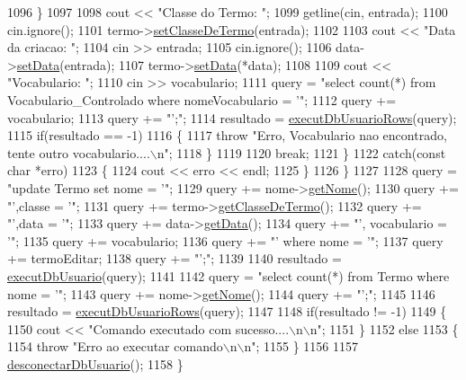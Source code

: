 \begin{DoxyCode}
1096       \}
1097 
1098       cout << \textcolor{stringliteral}{"Classe do Termo: "};
1099       getline(cin, entrada);
1100       cin.ignore();
1101       termo->\mbox{\hyperlink{class_termo_a8c32e501b39e008ea369650e3eb196b1}{setClasseDeTermo}}(entrada);
1102 
1103       cout << \textcolor{stringliteral}{"Data da criacao: "};
1104       cin >> entrada;
1105       cin.ignore();
1106       data->\mbox{\hyperlink{class_data_a5245638838a033c98a8b760836dddb7d}{setData}}(entrada);
1107       termo->\mbox{\hyperlink{class_termo_abf829a90ed067a580bb9d4c90db0f160}{setData}}(*data);
1108 
1109       cout << \textcolor{stringliteral}{"Vocabulario: "};
1110       cin >> vocabulario;
1111       query = \textcolor{stringliteral}{"select count(*) from Vocabulario\_Controlado where nomeVocabulario = '"};
1112       query += vocabulario;
1113       query += \textcolor{stringliteral}{"';"};
1114       resultado = \mbox{\hyperlink{comando_sql_8cpp_af54952694f2fa7d76f969fb74b853cb9}{executDbUsuarioRows}}(query);
1115       \textcolor{keywordflow}{if}(resultado == -1)
1116       \{
1117         \textcolor{keywordflow}{throw} \textcolor{stringliteral}{"Erro, Vocabulario nao encontrado, tente outro vocabulario....\(\backslash\)n"};
1118       \}
1119 
1120       \textcolor{keywordflow}{break};
1121     \}
1122     \textcolor{keywordflow}{catch}(\textcolor{keyword}{const} \textcolor{keywordtype}{char} *erro)
1123     \{
1124       cout << erro << endl;
1125     \}
1126   \}
1127 
1128     query = \textcolor{stringliteral}{"update Termo set nome = '"};
1129     query += nome->\mbox{\hyperlink{class_nome_aad41176173eec20cbbae1576447a3697}{getNome}}();
1130     query += \textcolor{stringliteral}{"',classe = '"};
1131     query += termo->\mbox{\hyperlink{class_termo_ae7e8fb47c8e03506b98a952fa25aa97b}{getClasseDeTermo}}();
1132     query += \textcolor{stringliteral}{"',data = '"};
1133     query += data->\mbox{\hyperlink{class_data_afc7b15a5e81334858e48709b2f45cdc3}{getData}}();
1134     query += \textcolor{stringliteral}{"', vocabulario = '"};
1135     query += vocabulario;
1136     query += \textcolor{stringliteral}{"' where nome = '"};
1137     query += termoEditar;
1138     query += \textcolor{stringliteral}{"';"};
1139 
1140     resultado = \mbox{\hyperlink{comando_sql_8cpp_a748197580e7f9acdbf48c78de1f7924b}{executDbUsuario}}(query);
1141 
1142     query = \textcolor{stringliteral}{"select count(*) from Termo where nome = '"};
1143     query += nome->\mbox{\hyperlink{class_nome_aad41176173eec20cbbae1576447a3697}{getNome}}();
1144     query += \textcolor{stringliteral}{"';"};
1145 
1146     resultado = \mbox{\hyperlink{comando_sql_8cpp_af54952694f2fa7d76f969fb74b853cb9}{executDbUsuarioRows}}(query);
1147 
1148     \textcolor{keywordflow}{if}(resultado != -1)
1149     \{
1150       cout << \textcolor{stringliteral}{"Comando executado com sucesso....\(\backslash\)n\(\backslash\)n"};
1151     \}
1152     \textcolor{keywordflow}{else}
1153     \{
1154       \textcolor{keywordflow}{throw} \textcolor{stringliteral}{"Erro ao executar comando\(\backslash\)n\(\backslash\)n"};
1155     \}
1156 
1157     \mbox{\hyperlink{comando_sql_8cpp_a969be9911913568e30d4ae8963338bc3}{desconectarDbUsuario}}();
1158 \}
\end{DoxyCode}

